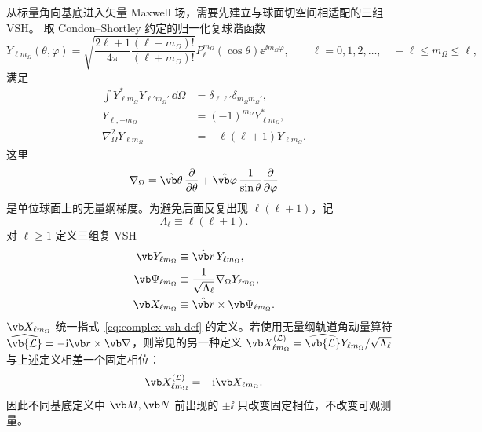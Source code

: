 从标量角向基底进入矢量 Maxwell 场，需要先建立与球面切空间相适配的三组 VSH。
取 Condon--Shortley 约定的归一化复球谐函数
\begin{equation}
Y_{\ell m_{\Omega}}(\theta,\varphi)
=\sqrt{\frac{2\ell+1}{4\pi}
\frac{(\ell-m_{\Omega})!}{(\ell+m_{\Omega})!}}
P_\ell^{m_{\Omega}}(\cos\theta)\ee^{\ii m_{\Omega}\varphi},
\qquad
\ell=0,1,2,\ldots,
\quad
-\ell\le m_{\Omega}\le\ell,
\label{eq:complex-spherical-harmonic}
\end{equation}
满足
\begin{align}
\int Y_{\ell m_{\Omega}}^*Y_{\ell' m_{\Omega}'}\,\dd\Omega
&=\delta_{\ell\ell'}\delta_{m_{\Omega}m_{\Omega}'},
\\
Y_{\ell,-m_{\Omega}}
&=(-1)^{m_{\Omega}} Y_{\ell m_{\Omega}}^*,
\\
\nabla_\Omega^2Y_{\ell m_{\Omega}}
&=-\ell(\ell+1)Y_{\ell m_{\Omega}}.
\end{align}
这里
\begin{equation}
\nabla_\Omega
=\hat{\vb\theta}\,\frac{\partial}{\partial\theta}
+\hat{\vb\varphi}\,\frac{1}{\sin\theta}
\frac{\partial}{\partial\varphi}
\end{equation}
是单位球面上的无量纲梯度。为避免后面反复出现
$\ell(\ell+1)$，记
\begin{equation}
\Lambda_\ell\equiv\ell(\ell+1).
\end{equation}
对 $\ell\ge1$ 定义三组复 VSH
\begin{align}
\vb Y_{\ell m_{\Omega}}
&\equiv \hat{\vb r}\,Y_{\ell m_{\Omega}},
\\
\vb\Psi_{\ell m_{\Omega}}
&\equiv\frac{1}{\sqrt{\Lambda_\ell}}
\nabla_\Omega Y_{\ell m_{\Omega}},
\\
\vb X_{\ell m_{\Omega}}
&\equiv\hat{\vb r}\times\vb\Psi_{\ell m_{\Omega}}.
\label{eq:complex-vsh-def}
\end{align}
$\vb X_{\ell m_{\Omega}}$ 统一指式~\cref{eq:complex-vsh-def} 的定义。若使用无量纲轨道角动量算符
$\widehat{\vb{\mathcal L}}=-\ii\vb r\times\vb\nabla$，则常见的另一种定义
$\vb X_{\ell m_{\Omega}}^{(\mathcal L)}=\widehat{\vb{\mathcal L}}Y_{\ell m_{\Omega}}/\sqrt{\Lambda_\ell}$
与上述定义相差一个固定相位：
\begin{equation}
\vb X_{\ell m_{\Omega}}^{(\mathcal L)}=-\ii\vb X_{\ell m_{\Omega}}.
\label{eq:vsh-phase-relation}
\end{equation}
因此不同基底定义中 $\vb M,\vb N$ 前出现的 $\pm\ii$ 只改变固定相位，不改变可观测量。

